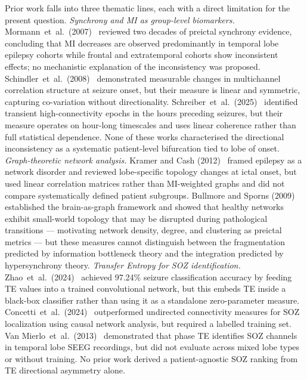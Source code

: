 \documentclass[final,5p,times,twocolumn]{elsarticle}
\begin{document}
Prior work falls into three thematic lines, each with a direct
limitation for the present question.
%
\textit{Synchrony and MI as group-level biomarkers.}
%
Mormann~et~al.\ (2007)~\cite{mormann2007} reviewed two decades of
preictal synchrony evidence, concluding that MI decreases are observed
predominantly in temporal lobe epilepsy cohorts while frontal and
extratemporal cohorts show inconsistent effects; no mechanistic
explanation of the inconsistency was proposed.
%
Schindler~et~al.\ (2008)~\cite{schindler2008} demonstrated measurable
changes in multichannel correlation structure at seizure onset, but
their measure is linear and symmetric, capturing co-variation without
directionality.
%
Schreiber~et~al.\ (2025)~\cite{schreiber2025} identified transient
high-connectivity epochs in the hours preceding seizures, but their
measure operates on hour-long timescales and uses linear coherence
rather than full statistical dependence.
%
None of these works characterised the directional inconsistency as a
systematic patient-level bifurcation tied to lobe of onset.
%
\textit{Graph-theoretic network analysis.}
%
Kramer and Cash (2012)~\cite{kramer2012} framed epilepsy as a network
disorder and reviewed lobe-specific topology changes at ictal onset, but
used linear correlation matrices rather than MI-weighted graphs and did
not compare systematically defined patient subgroups.
%
Bullmore and Sporns (2009)~\cite{bullmore2009} established the
brain-as-graph framework and showed that healthy networks exhibit
small-world topology that may be disrupted during pathological
transitions --- motivating network density, degree, and clustering as
preictal metrics --- but these measures cannot distinguish between the
fragmentation predicted by information bottleneck theory and the
integration predicted by hypersynchrony theory.
%
\textit{Transfer Entropy for SOZ identification.}
%
Zhao~et~al.\ (2024)~\cite{zhao2024} achieved 97.24\% seizure
classification accuracy by feeding TE values into a trained
convolutional network, but this embeds TE inside a black-box classifier
rather than using it as a standalone zero-parameter measure.
%
Concetti~et~al.\ (2024)~\cite{concetti2024} outperformed undirected
connectivity measures for SOZ localization using causal network
analysis, but required a labelled training set.
%
Van Mierlo~et~al.\ (2013)~\cite{vanmierlo2013} demonstrated that phase
TE identifies SOZ channels in temporal lobe SEEG recordings, but did
not evaluate across mixed lobe types or without training.
%
No prior work derived a patient-agnostic SOZ ranking from TE directional
asymmetry alone.
\end{document}
